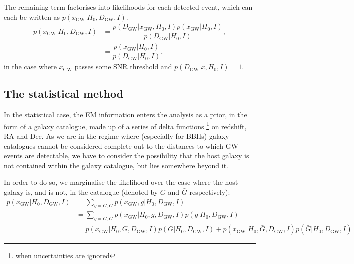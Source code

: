 \documentclass[a4paper,10pt]{article}
\begin{document}
The remaining term factorises into likelihoods for each detected event,
which can each be written as $p(x_{\text{GW}}|H_0,D_{\text{GW}},I)$.
\begin{equation}
\begin{aligned}
p(x_{\text{GW}}|H_0,D_{\text{GW}},I) &= \dfrac{p(D_{\text{GW}}|x_{\text{GW}},H_0,I)p(x_{\text{GW}}|H_0,I)}{p(D_{\text{GW}}|H_0,I)},
\\ &= \dfrac{p(x_{\text{GW}}|H_0,I)}{p(D_{\text{GW}}|H_0,I)},
\end{aligned} 
\end{equation}
in the case where $x_{\text{GW}}$ passes some SNR threshold and $p(D_{\text{GW}}|x,H_0,I)=1$.

\subsection{The statistical method}
In the statistical case, the EM information enters the analysis as a prior, in the form of a galaxy catalogue, made up of a series of delta functions \footnote{when uncertainties are ignored} on redshift, RA and Dec.  As we are in the regime where (especially for BBHs) galaxy catalogues cannot be considered complete out to the distances to which GW events are detectable, we have to consider the possibility that the host galaxy is not contained within the galaxy catalogue, but lies somewhere beyond it.

In order to do so, we marginalise the likelihood over the case where the host galaxy is, and is not, in the catalogue (denoted by $G$ and $\bar{G}$ respectively):
\begin{equation} \label{Eq:sum G}
\begin{aligned}
p(x_{\text{GW}}|H_0,D_{\text{GW}},I) &= \sum_{g=G,\bar{G}} p(x_{\text{GW}},g|H_0,D_{\text{GW}},I)
\\ &= \sum_{g=G,\bar{G}} p(x_{\text{GW}}|H_0,g,D_{\text{GW}},I) p(g|H_0,D_{\text{GW}},I)
\\ &= p(x_{\text{GW}}|H_0,G,D_{\text{GW}},I) p(G|H_0,D_{\text{GW}},I) + p(x_{\text{GW}}|H_0,\bar{G},D_{\text{GW}},I) p(\bar{G}|H_0,D_{\text{GW}},I)
\end{aligned} 
\end{equation}
\end{document}

